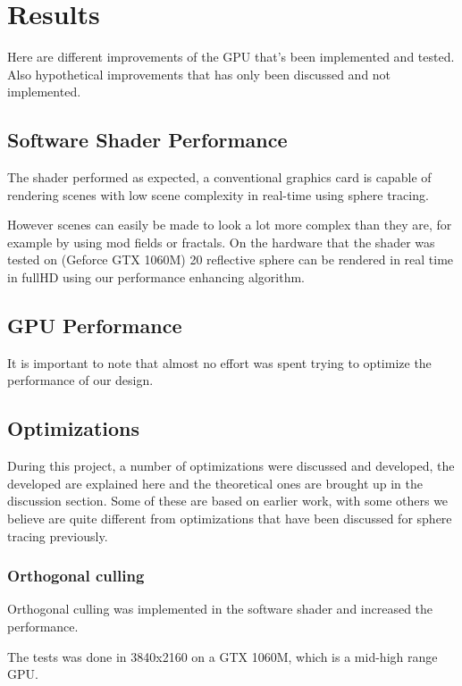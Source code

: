 \chapter{Results}

	Here are different improvements of the GPU that's been implemented and tested.
	Also hypothetical improvements that has only been discussed and not
	implemented.

	\section{Software Shader Performance}

		The shader performed as expected, a conventional graphics card is 
		capable of rendering scenes with low scene complexity in real-time
		using sphere tracing.

		However scenes can easily be made to look a lot more complex than they 
		are, for example by using mod fields or fractals. On the hardware that 
		the shader was tested on (Geforce GTX 1060M) 20 reflective sphere can
		be rendered in real time in fullHD using our performance enhancing 
		algorithm.


	\section{GPU Performance}

		It is important to note that almost no effort was spent trying to
		optimize the performance of our design. 

	\section{Optimizations}
		
		During this project, a number of optimizations were discussed and 
		developed, the developed are explained here and the theoretical ones
		are brought up in the discussion section. Some of these are based on earlier
		work, with some others we believe are quite different from optimizations
		that have been discussed for sphere tracing previously.

		\subsection{Orthogonal culling}
			Orthogonal culling was implemented in the software shader and increased 
			the performance.

			The tests was done in 3840x2160 on a GTX 1060M, which is a mid-high range 
			GPU.

